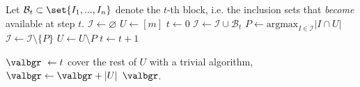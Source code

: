 \begin{algorithm}[!t]
\caption{\bgreedy}\label{alg:block_greedy}
\begin{algorithmic}[1]
\State Let \(\mathcal{B}_t \subset \set{I_1,...,I_n}\) denote the \(t\)-th block, i.e. the inclusion sets that {\it become} available at step \(t\).
\State \(\mathcal{I} \gets \varnothing\)
\State $U \gets [m]$
\State $t \gets 0$
    \State \(\mathcal{I} \gets \mathcal{I} \cup \mathcal{B}_t\) \label{step:adding_new_block} 
    \State \(P \gets \mathrm{argmax}_{I \in \mathcal{I}}\bigl|I \cap U\bigr| \)  \label{step:greedy_step} 
    \State \(\mathcal{I} \gets \mathcal{I} \setminus \{P\}\)
    \State \(U \gets U \setminus P\)
    \State \(t \gets t + 1\)

\EndWhile
\State \(\valbgr\ \gets t\)
 \quad cover the rest of \(U\) with a trivial algorithm, \(\valbgr \gets \valbgr + |U|\)
\EndIf
\State \Return \(\valbgr\).
\end{algorithmic}
\end{algorithm}
%
